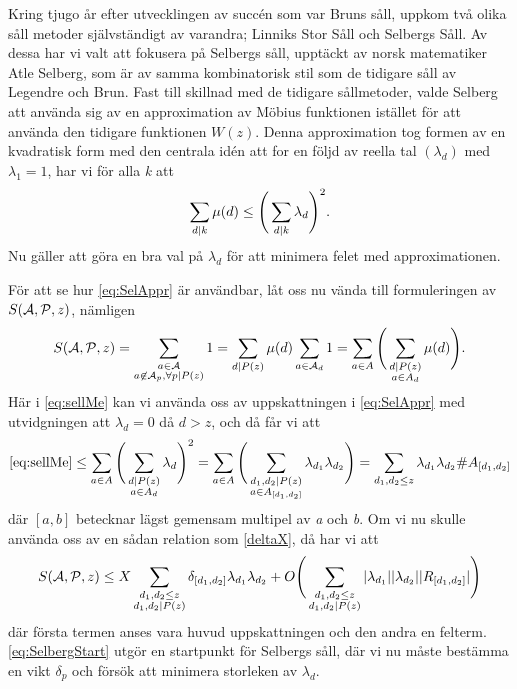 Kring tjugo år efter utvecklingen av succén som var Bruns såll, uppkom två olika såll metoder självständigt av varandra; Linniks Stor Såll och Selbergs Såll. Av dessa har vi valt att fokusera på Selbergs såll, upptäckt av norsk matematiker Atle Selberg, som är av samma kombinatorisk stil som de tidigare såll av Legendre och Brun. Fast till skillnad med de tidigare sållmetoder, valde Selberg att använda sig av en approximation av Möbius funktionen istället för att använda den tidigare funktionen \(W(z)\). Denna approximation tog formen av en kvadratisk form med den centrala idén att for en följd av reella tal \((\lambda_d)\) med \(\lambda_1 = 1\), har vi för alla \textit{k} att 
\begin{equation}
    \sum_{d\divides k} \mu(d) \leq \Bigg(\sum_{d\divides k}\lambda_d\Bigg)^2.\label{eq:SelAppr}
\end{equation}
Nu gäller att göra en bra val på \(\lambda_d\) för att minimera felet med approximationen. 

För att se hur \eqref{eq:SelAppr} är användbar, låt oss nu vända till formuleringen av \(\S{A}{P}{z}\), nämligen
\begin{align}
    \S{A}{P}{z} = \sum_{\substack{a\in \mathcal{A}\\a\not\in\mathcal{A}_p,\forall p\divides P(z)}} 1 = \sum_{d\divides P(z)} \mu(d) \sum_{a\in\mathcal{A}_d}1 = \sum_{a\in A} \Bigg(\sum_{\substack{d\divides P(z)\\a\in A_d}}\mu(d)\Bigg).\label{eq:sellMe}
\end{align}
Här i \eqref{eq:sellMe} kan vi använda oss av uppskattningen i \eqref{eq:SelAppr} med utvidgningen att \(\lambda_d=0\) då \(d>z\), och då får vi att
\begin{equation}
    \eqref{eq:sellMe} \leq \sum_{a\in A}\Bigg(\sum_{\substack{d\divides P(z)\\a\in A_d}}\lambda_d\Bigg)^2 = \sum_{a\in A}\Bigg(\sum_{\substack{d_1,d_2\divides P(z)\\a\in A_{[d_1, d_2]}}}\lambda_{d_1}\lambda_{d_2}\Bigg) =  \sum_{d_1,d_2\leq z}\lambda_{d_1}\lambda_{d_2}\#A_{[d_1, d_2]}\label{eq:2FatLs}
\end{equation}
där \([a, b]\) betecknar lägst gemensam multipel av \textit{a} och \textit{b}. Om vi nu skulle använda oss av en sådan relation som \eqref{deltaX}, då har vi att 
\begin{equation}
    \S{A}{P}{z} \leq X\sum_{\substack{d_1,d_2\leq z\\d_1,d_2\divides P(z)}}\delta_{[d_1, d_2]}\lambda_{d_1}\lambda_{d_2} + O\Bigg(\sum_{\substack{d_1,d_2\leq z\\d_1,d_2\divides P(z)}}|\lambda_{d_1}||\lambda_{d_2}||R_{[d_1, d_2]}|\Bigg)\label{eq:SelbergStart}
\end{equation}
där första termen anses vara huvud uppskattningen och den andra en felterm. \eqref{eq:SelbergStart} utgör en startpunkt för Selbergs såll, där vi nu måste bestämma en vikt \(\delta_p\) och försök att minimera storleken av \(\lambda_d\).
